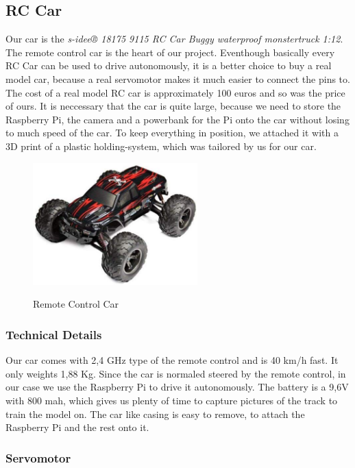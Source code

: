 \documentclass[journal]{IEEEtran}
\begin{document}
\subsection{RC Car}
Our car is the \textit{s-idee® 18175 9115 RC Car Buggy waterproof monstertruck 1:12}.
The remote control car is the heart of our project. Eventhough basically every RC Car can be used to drive autonomously, it is a better choice to buy a real model car, because a real servomotor makes it much easier to connect the pins to. The cost of a real model RC car is approximately 100 euros and so was the price of ours. It is neccessary that the car is quite large, because we need to store the Raspberry Pi, the camera and a powerbank for the Pi onto the car without losing to much speed of the car. To keep everything in position, we attached it with a 3D print of a plastic holding-system, which was tailored by us for our car. \\

\begin{figure}
  \begin{center}
  \includegraphics[width=2.5in]{photo/car.jpg}\\
  \caption{Remote Control Car}\label{car}
  \end{center}
\end{figure}

\subsubsection{Technical Details}
Our car comes with 2,4 GHz type of the remote control and is 40 km/h fast. It only weights 1,88 Kg. Since the car is normaled steered by the remote control, in our case we use the Raspberry Pi to drive it autonomously. The battery is a 9,6V with 800 mah, which gives us plenty of time to capture pictures of the track to train the model on. The car like casing is easy to remove, to attach the Raspberry Pi and the rest onto it.

\subsubsection{Servomotor}
\end{document}
